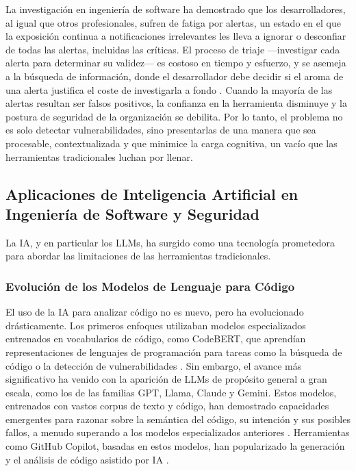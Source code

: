 La investigación en ingeniería de software ha demostrado que los desarrolladores, al igual que otros profesionales, sufren de fatiga por alertas, un estado en el que la exposición continua a notificaciones irrelevantes les lleva a ignorar o desconfiar de todas las alertas, incluidas las críticas. El proceso de triaje —investigar cada alerta para determinar su validez— es costoso en tiempo y esfuerzo, y se asemeja a la búsqueda de información, donde el desarrollador debe decidir si el aroma de una alerta justifica el coste de investigarla a fondo \cite{Parnin2011InformationForaging}. Cuando la mayoría de las alertas resultan ser falsos positivos, la confianza en la herramienta disminuye y la postura de seguridad de la organización se debilita. Por lo tanto, el problema no es solo detectar vulnerabilidades, sino presentarlas de una manera que sea procesable, contextualizada y que minimice la carga cognitiva, un vacío que las herramientas tradicionales luchan por llenar.

\subsection{Aplicaciones de Inteligencia Artificial en Ingeniería de Software y Seguridad}
La IA, y en particular los LLMs, ha surgido como una tecnología prometedora para abordar las limitaciones de las herramientas tradicionales.

\subsubsection{Evolución de los Modelos de Lenguaje para Código}
El uso de la IA para analizar código no es nuevo, pero ha evolucionado drásticamente. Los primeros enfoques utilizaban modelos especializados entrenados en vocabularios de código, como CodeBERT, que aprendían representaciones de lenguajes de programación para tareas como la búsqueda de código o la detección de vulnerabilidades \cite{6}. Sin embargo, el avance más significativo ha venido con la aparición de LLMs de propósito general a gran escala, como los de las familias GPT, Llama, Claude y Gemini. Estos modelos, entrenados con vastos corpus de texto y código, han demostrado capacidades emergentes para razonar sobre la semántica del código, su intención y sus posibles fallos, a menudo superando a los modelos especializados anteriores \cite{Siddiq2024LLMSurvey}. Herramientas como GitHub Copilot, basadas en estos modelos, han popularizado la generación y el análisis de código asistido por IA \cite{GitHubCopilotFeatures, Wang2022CopilotSecurity}.

